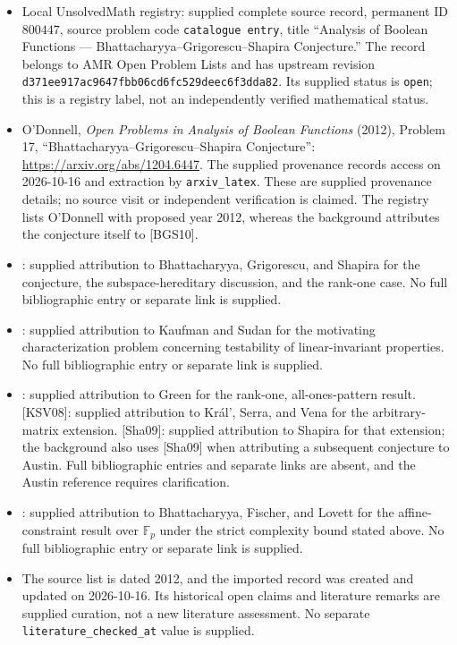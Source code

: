 \documentclass[11pt]{article}
\begin{document}
\begin{itemize}
\item Local UnsolvedMath registry: supplied complete source record, permanent ID \(800447\), source problem code \texttt{catalogue entry}, title ``Analysis of Boolean Functions --- Bhattacharyya--Grigorescu--Shapira Conjecture.'' The record belongs to AMR Open Problem Lists and has upstream revision \texttt{d371ee917ac9647fbb06cd6fc529deec6f3dda82}. Its supplied status is \texttt{open}; this is a registry label, not an independently verified mathematical status.
\item O'Donnell, \emph{Open Problems in Analysis of Boolean Functions} (2012), Problem 17, ``Bhattacharyya--Grigorescu--Shapira Conjecture'': \url{https://arxiv.org/abs/1204.6447}. The supplied provenance records access on 2026-10-16 and extraction by \texttt{arxiv\_latex}. These are supplied provenance details; no source visit or independent verification is claimed. The registry lists O'Donnell with proposed year 2012, whereas the background attributes the conjecture itself to [BGS10].
\item [BGS10]: supplied attribution to Bhattacharyya, Grigorescu, and Shapira for the conjecture, the subspace-hereditary discussion, and the rank-one case. No full bibliographic entry or separate link is supplied.
\item [KS08]: supplied attribution to Kaufman and Sudan for the motivating characterization problem concerning testability of linear-invariant properties. No full bibliographic entry or separate link is supplied.
\item [Gre05a]: supplied attribution to Green for the rank-one, all-ones-pattern result. [KSV08]: supplied attribution to Kr\'{a}l', Serra, and Vena for the arbitrary-matrix extension. [Sha09]: supplied attribution to Shapira for that extension; the background also uses [Sha09] when attributing a subsequent conjecture to Austin. Full bibliographic entries and separate links are absent, and the Austin reference requires clarification.
\item [BFL12]: supplied attribution to Bhattacharyya, Fischer, and Lovett for the affine-constraint result over \(\mathbb F_p\) under the strict complexity bound stated above. No full bibliographic entry or separate link is supplied.
\item The source list is dated 2012, and the imported record was created and updated on 2026-10-16. Its historical open claims and literature remarks are supplied curation, not a new literature assessment. No separate \texttt{literature\_checked\_at} value is supplied.
\end{itemize}
\end{document}

